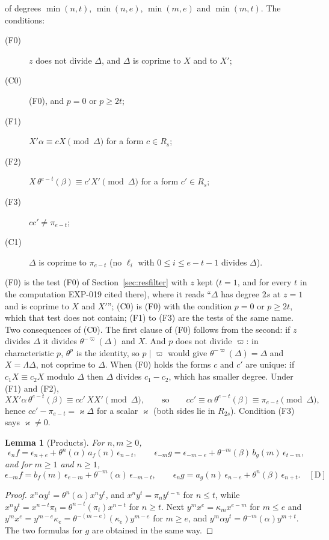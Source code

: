 \documentclass[11pt]{article}
\newtheorem{lemma}{Lemma}
\theoremstyle{definition}
\theoremstyle{remark}
\newcommand{\EXP}[1]{\mbox{EXP-#1}}
\begin{document}
of degrees $\min(n,t)$, $\min(n,e)$, $\min(m,e)$ and $\min(m,t)$. The conditions:
\begin{description}
\item[(F0)] $z$ does not divide $\Delta$, and $\Delta$ is coprime to $X$ and to $X'$;
\item[(C0)] (F0), and $p=0$ or $p\ge2t$;
\item[(F1)] $X'\alpha\equiv cX\pmod\Delta$ for a form $c\in R_s$;
\item[(F2)] $X\,\theta^{e-t}(\beta)\equiv c'X'\pmod\Delta$ for a form $c'\in R_s$;
\item[(F3)] $cc'\ne\pi_{e-t}$;
\item[(C1)] $\Delta$ is coprime to $\pi_{e-t}$ (no $\ell_i$ with $0\le i\le e-t-1$ divides $\Delta$).
\end{description}
(F0) is the test (F0) of Section~\ref{sec:resfilter} with $z$ kept ($t=1$, and for every $t$ in the computation \EXP{019} cited there), where it reads ``$\Delta$ has degree $2s$ at $z=1$ and is coprime to $X$ and $X'$''; (C0) is (F0) with the condition $p=0$ or $p\ge2t$, which that test does not contain; (F1) to (F3) are the tests of the same name. Two consequences of (C0). The first clause of (F0) follows from the second: if $z$ divides $\Delta$ it divides $\theta^{-\varpi}(\Delta)$ and $X$. And $p$ does not divide $\varpi$: in characteristic $p$, $\theta^p$ is the identity, so $p\mid\varpi$ would give $\theta^{-\varpi}(\Delta)=\Delta$ and $X=\Lambda\Delta$, not coprime to $\Delta$. When (F0) holds the forms $c$ and $c'$ are unique: if $c_1X\equiv c_2X$ modulo $\Delta$ then $\Delta$ divides $c_1-c_2$, which has smaller degree. Under (F1) and (F2),
\[
XX'\alpha\,\theta^{e-t}(\beta)\equiv cc'\,XX'\pmod\Delta,\qquad\text{so}\qquad cc'\equiv\alpha\,\theta^{e-t}(\beta)\equiv\pi_{e-t}\pmod\Delta,
\]
hence $cc'-\pi_{e-t}=\varkappa\Delta$ for a scalar $\varkappa$ (both sides lie in $R_{2s}$). Condition (F3) says $\varkappa\ne0$.

\begin{lemma}[Products]\label{lem:exptprod}
For $n,m\ge0$,
\[
\epsilon_nf=\epsilon_{n+e}+\theta^n(\alpha)\,a_f(n)\,\epsilon_{n-t},\qquad\epsilon_{-m}g=\epsilon_{-m-e}+\theta^{-m}(\beta)\,b_g(m)\,\epsilon_{t-m},
\]
and for $m\ge1$ and $n\ge1$,
\[
\epsilon_{-m}f=b_f(m)\,\epsilon_{e-m}+\theta^{-m}(\alpha)\,\epsilon_{-m-t},\qquad\epsilon_ng=a_g(n)\,\epsilon_{n-e}+\theta^n(\beta)\,\epsilon_{n+t}.\quad[\mathrm D]
\]
\end{lemma}
\begin{proof}
$x^n\alpha y^t=\theta^n(\alpha)x^ny^t$, and $x^ny^t=\pi_ny^{t-n}$ for $n\le t$, while $x^ny^t=x^{n-t}\pi_t=\theta^{n-t}(\pi_t)x^{n-t}$ for $n\ge t$. Next $y^mx^e=\kappa_mx^{e-m}$ for $m\le e$ and $y^mx^e=y^{m-e}\kappa_e=\theta^{-(m-e)}(\kappa_e)y^{m-e}$ for $m\ge e$, and $y^m\alpha y^t=\theta^{-m}(\alpha)y^{m+t}$. The two formulas for $g$ are obtained in the same way.
\end{proof}
\end{document}
